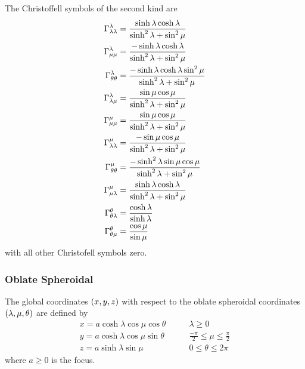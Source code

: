 The Christoffell symbols of the second kind are
\begin{align}
   \Gamma^{\lambda}_{\lambda\lambda} &=\frac{\sinh\lambda\cosh\lambda}{\sinh^{2}\lambda+\sin^{2}\mu} \\
   \Gamma^{\lambda}_{\mu\mu} &=\frac{-\sinh\lambda\cosh\lambda}{\sinh^{2}\lambda+\sin^{2}\mu} \\
   \Gamma^{\lambda}_{\theta\theta} &=\frac{-\sinh\lambda\cosh\lambda\sin^{2}\mu}{\sinh^{2}\lambda+\sin^{2}\mu} \\
   \Gamma^{\lambda}_{\lambda\mu} &=\frac{\sin\mu\cos\mu}{\sinh^{2}\lambda+\sin^{2}\mu} \\
   \Gamma^{\mu}_{\mu\mu} &=\frac{\sin\mu\cos\mu}{\sinh^{2}\lambda+\sin^{2}\mu} \\
   \Gamma^{\mu}_{\lambda\lambda} &=\frac{-\sin\mu\cos\mu}{\sinh^{2}\lambda+\sin^{2}\mu} \\
   \Gamma^{\mu}_{\theta\theta} &=\frac{-\sinh^{2}\lambda\sin\mu\cos\mu}{\sinh^{2}\lambda+\sin^{2}\mu} \\
   \Gamma^{\mu}_{\mu\lambda} &=\frac{\sinh\lambda\cosh\lambda}{\sinh^{2}\lambda+\sin^{2}\mu} \\
   \Gamma^{\theta}_{\theta\lambda} &=\frac{\cosh\lambda}{\sinh\lambda} \\
   \Gamma^{\theta}_{\theta\mu} &=\frac{\cos\mu}{\sin\mu} \\
 \end{align}
with all other Christofell symbols zero.

\subsubsection{Oblate Spheroidal}

The global coordinates $\left( x,y,z \right)$ with respect to the oblate spheroidal
coordinates $\left( \lambda,\mu,\theta \right)$  are defined by
\begin{equation}
  \begin{aligned}
    x = a\cosh\lambda\cos\mu\cos\theta & \qquad \lambda \ge 0 \\
    y = a\cosh\lambda\cos\mu\sin\theta & \qquad \frac{-\pi}{2} \le \mu \le \frac{\pi}{2} \\
    z = a\sinh\lambda\sin\mu & \qquad 0 \le \theta \le 2\pi 
  \end{aligned}
\end{equation}
where $a\ge0$ is the focus.

